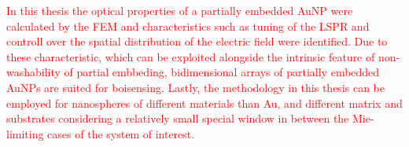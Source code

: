 \textcolor{red}{In this thesis the optical properties of a partially embedded AuNP were calculated by the FEM and characteristics such as tuning of the LSPR and controll over the spatial distribution of the electric field were identified. Due to these characteristic, which can be exploited alongside the intrinsic feature of  non-washability  of partial embbeding, bidimensional arrays of partially embedded AuNPs are suited for boisensing. Lastly, the methodology in this thesis can be employed for nanospheres of different materials than Au, and different matrix and substrates considering a relatively small special window in between the Mie-limiting cases of the system of interest.}

























